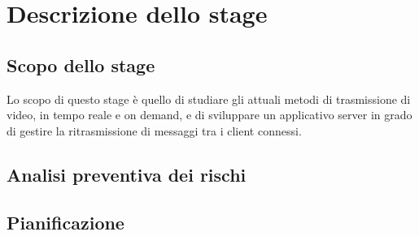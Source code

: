 \chapter{Descrizione dello stage\label{cap:descrizionestage}}
\section{Scopo dello stage}

Lo scopo di questo stage è quello di studiare gli attuali metodi di trasmissione di video, in tempo reale e on demand, e di sviluppare un applicativo server in grado di gestire la ritrasmissione di messaggi tra i client connessi.

\section{Analisi preventiva dei rischi}


\section{Pianificazione}